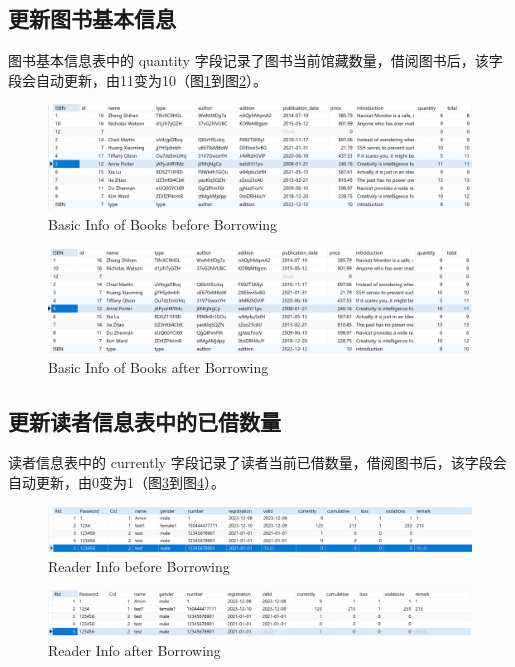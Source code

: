 \documentclass{article}
\begin{document}
\subsection{更新图书基本信息}
图书基本信息表中的 quantity 字段记录了图书当前馆藏数量，借阅图书后，该字段会自动更新，由11变为10（图\ref{fig:basic}到图\ref{fig:basic_after}）。

\begin{figure}[H]
    \centering
    \includegraphics[width=1\textwidth]{../pic/basic.png}
    \caption{Basic Info of Books before Borrowing}
    \label{fig:basic}
\end{figure}

\begin{figure}[H]
    \centering
    \includegraphics[width=1\textwidth]{../pic/basic_after.png}
    \caption{Basic Info of Books after Borrowing}
    \label{fig:basic_after}
\end{figure}

\subsection{更新读者信息表中的已借数量}
读者信息表中的 currently 字段记录了读者当前已借数量，借阅图书后，该字段会自动更新，由0变为1（图\ref{fig:reader}到图\ref{fig:reader_after}）。

\begin{figure}[H]
    \centering
    \includegraphics[width=1\textwidth]{../pic/reader.png}
    \caption{Reader Info before Borrowing}
    \label{fig:reader}
\end{figure}

\begin{figure}[H]
    \centering
    \includegraphics[width=1\textwidth]{../pic/reader_after.png}
    \caption{Reader Info after Borrowing}
    \label{fig:reader_after}
\end{figure}
\end{document}
